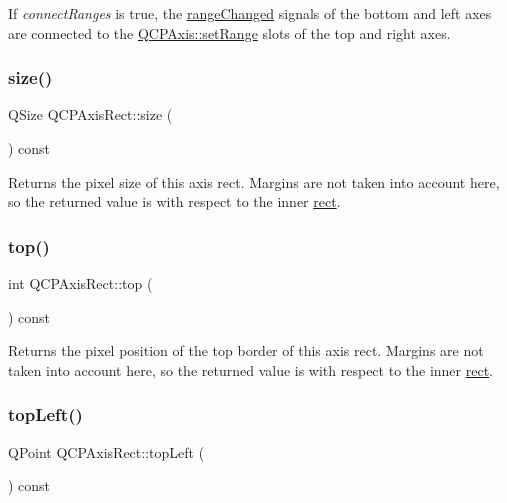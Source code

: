 If {\itshape connect\+Ranges} is true, the \hyperlink{class_q_c_p_axis_a0894084e4c16a1736534c4095746f910}{range\+Changed} signals of the bottom and left axes are connected to the \hyperlink{class_q_c_p_axis_aebdfea5d44c3a0ad2b4700cd4d25b641}{Q\+C\+P\+Axis\+::set\+Range} slots of the top and right axes. \hypertarget{class_q_c_p_axis_rect_a7a8289346eb612f422c704f8b75cf479}{}\label{class_q_c_p_axis_rect_a7a8289346eb612f422c704f8b75cf479} 
\subsubsection{\texorpdfstring{size()}{size()}}
{\footnotesize\ttfamily Q\+Size Q\+C\+P\+Axis\+Rect\+::size (\begin{DoxyParamCaption}{ }\end{DoxyParamCaption}) const\hspace{0.3cm}{\ttfamily [inline]}}

Returns the pixel size of this axis rect. Margins are not taken into account here, so the returned value is with respect to the inner \hyperlink{class_q_c_p_layout_element_a208effccfe2cca4a0eaf9393e60f2dd4}{rect}. \hypertarget{class_q_c_p_axis_rect_a45dbad181cbb9f09d068dbb76c817c95}{}\label{class_q_c_p_axis_rect_a45dbad181cbb9f09d068dbb76c817c95} 
\subsubsection{\texorpdfstring{top()}{top()}}
{\footnotesize\ttfamily int Q\+C\+P\+Axis\+Rect\+::top (\begin{DoxyParamCaption}{ }\end{DoxyParamCaption}) const\hspace{0.3cm}{\ttfamily [inline]}}

Returns the pixel position of the top border of this axis rect. Margins are not taken into account here, so the returned value is with respect to the inner \hyperlink{class_q_c_p_layout_element_a208effccfe2cca4a0eaf9393e60f2dd4}{rect}. \hypertarget{class_q_c_p_axis_rect_a5a847b3ddeca3abec38d3838fefb0dbd}{}\label{class_q_c_p_axis_rect_a5a847b3ddeca3abec38d3838fefb0dbd} 
\subsubsection{\texorpdfstring{top\+Left()}{topLeft()}}
{\footnotesize\ttfamily Q\+Point Q\+C\+P\+Axis\+Rect\+::top\+Left (\begin{DoxyParamCaption}{ }\end{DoxyParamCaption}) const\hspace{0.3cm}{\ttfamily [inline]}}

